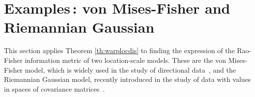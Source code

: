 \documentclass{svmult}
\begin{document}
% 




\section{Examples\,: von Mises-Fisher and Riemannian Gaussian} \label{sec:examples}
This section applies Theorem \ref{th:warplocdis} to finding the expression of the Rao-Fisher information metric of two location-scale models. These are the von Mises-Fisher model, which is widely used in the study of directional data~\cite{jupp,chikuse}, and the Riemannian Gaussian model, recently introduced in the study of data with values in spaces of covariance matrices~\cite{vemuri,said1,said2}. 
\end{document}
